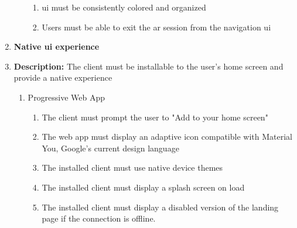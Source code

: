 \documentclass[thesis]{fputhesis}
\begin{document}
\begin{body}
\begin{enumerate}
\begin{enumerate}
\begin{enumerate}
            \item[\textbullet] \acrshort{ui} must be consistently colored and organized
            \item[\textbullet] Users must be able to exit the \acrshort{ar} session from the navigation \acrshort{ui}
        \end{enumerate}
    \end{enumerate}
    \item \textbf{Native \acrshort{ui} experience}
    \item[] \textbf{Description:} The client must be installable to the user's home screen and provide a native experience
    \begin{enumerate}
        \item[\textbullet] Progressive Web App
        \begin{enumerate}
            \item[\textbullet] The client must prompt the user to "Add to your home screen"
            \item[\textbullet] The web app must display an adaptive icon compatible with Material You, Google's current design language
            \item[\textbullet] The installed client must use native device themes
            \item[\textbullet] The installed client must display a splash screen on load
            \item[\textbullet] The installed client must display a disabled version of the landing page if the connection is offline.
        \end{enumerate}
    \end{enumerate}
\end{enumerate}
\filbreak

\end{body}
\end{document}
